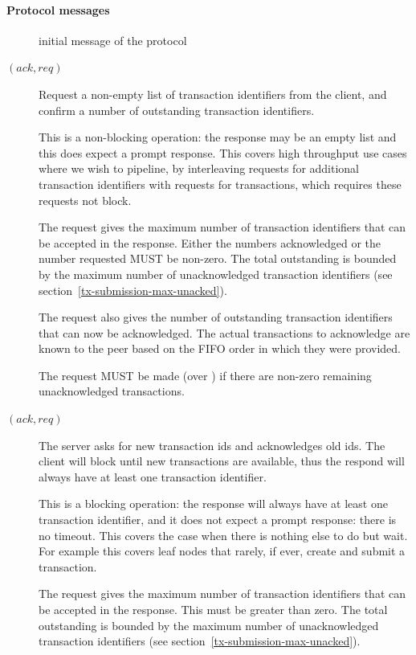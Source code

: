 \paragraph{Protocol messages}
\begin{description}
\item [\MsgInit] initial message of the protocol
\item [\MsgRequestTxIdsNB{} {\boldmath $(ack,req)$}]
      Request a non-empty list of transaction identifiers from the client,
      and confirm a number of outstanding transaction identifiers.

      This is a non-blocking operation: the response
      may be an empty list and this does expect a prompt response. This
      covers high throughput use cases where we wish to pipeline, by
      interleaving requests for additional transaction identifiers with
      requests for transactions, which requires these requests not block.

      The request gives the maximum number of transaction identifiers that
      can be accepted in the response. Either the numbers acknowledged or the
      number requested MUST be non-zero.  The total outstanding is bounded by
      the maximum number of unacknowledged transaction identifiers (see
      section~\ref{tx-submission-max-unacked}).

      The request also gives the number of outstanding transaction identifiers
      that can now be acknowledged. The actual transactions to acknowledge are
      known to the peer based on the FIFO order in which they were provided.

      The request MUST be made (over \MsgRequestTxIdsNB{}) if there are non-zero
      remaining unacknowledged transactions.
\item [\MsgRequestTxIdsB{} {\boldmath $(ack,req)$}]
      The server asks for new transaction ids and acknowledges old ids.
      The client will block until new transactions are available, thus the
      respond will always have at least one transaction identifier. 

      This is a blocking operation: the response will always have at least one
      transaction identifier, and it does not expect a prompt response: there
      is no timeout. This covers the case when there is nothing else to do but
      wait. For example this covers leaf nodes that rarely, if ever, create and
      submit a transaction.

      The request gives the maximum number of transaction identifiers that
      can be accepted in the response. This must be greater than zero.
      The total outstanding is bounded by the maximum number of
      unacknowledged transaction identifiers (see
      section~\ref{tx-submission-max-unacked}).


\end{description}
